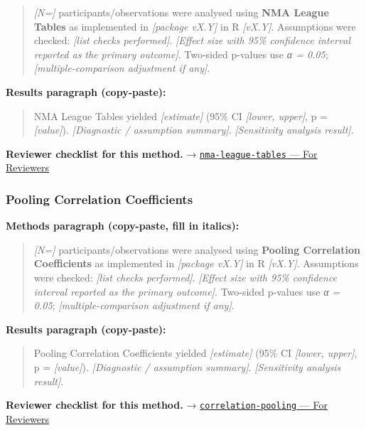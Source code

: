 \documentclass[
]{article}
\begin{document}
\begin{quote}
\emph{{[}N={]}} participants/observations were analysed using
\textbf{NMA League Tables} as implemented in \emph{{[}package vX.Y{]}}
in R \emph{{[}vX.Y{]}}. Assumptions were checked: \emph{{[}list checks
performed{]}}. \emph{{[}Effect size with 95\% confidence interval
reported as the primary outcome{]}}. Two-sided p-values use \emph{α =
0.05}; \emph{{[}multiple-comparison adjustment if any{]}}.
\end{quote}

\textbf{Results paragraph (copy-paste):}

\begin{quote}
NMA League Tables yielded \emph{{[}estimate{]}} (95\% CI \emph{{[}lower,
upper{]}}, p = \emph{{[}value{]}}). \emph{{[}Diagnostic / assumption
summary{]}}. \emph{{[}Sensitivity analysis result{]}}.
\end{quote}

\textbf{Reviewer checklist for this method.} →
\href{../chapters/15-metaanalysis/nma-league-tables.Rmd\#for-reviewers}{\texttt{nma-league-tables}
--- For Reviewers}

\subsubsection{Pooling Correlation
Coefficients}\label{pooling-correlation-coefficients}

\textbf{Methods paragraph (copy-paste, fill in italics):}

\begin{quote}
\emph{{[}N={]}} participants/observations were analysed using
\textbf{Pooling Correlation Coefficients} as implemented in
\emph{{[}package vX.Y{]}} in R \emph{{[}vX.Y{]}}. Assumptions were
checked: \emph{{[}list checks performed{]}}. \emph{{[}Effect size with
95\% confidence interval reported as the primary outcome{]}}. Two-sided
p-values use \emph{α = 0.05}; \emph{{[}multiple-comparison adjustment if
any{]}}.
\end{quote}

\textbf{Results paragraph (copy-paste):}

\begin{quote}
Pooling Correlation Coefficients yielded \emph{{[}estimate{]}} (95\% CI
\emph{{[}lower, upper{]}}, p = \emph{{[}value{]}}). \emph{{[}Diagnostic
/ assumption summary{]}}. \emph{{[}Sensitivity analysis result{]}}.
\end{quote}

\textbf{Reviewer checklist for this method.} →
\href{../chapters/15-metaanalysis/correlation-pooling.Rmd\#for-reviewers}{\texttt{correlation-pooling}
--- For Reviewers}
\end{document}

